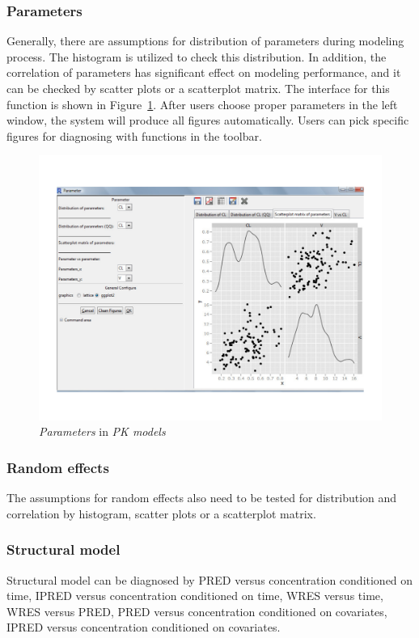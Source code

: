 \documentclass[a4paper]{article}
\begin{document}
\subsubsection{Parameters}
Generally, there are assumptions for distribution of parameters during modeling process. The histogram is utilized to check this distribution. In addition, the correlation of parameters has significant effect on modeling performance, and it can be checked by scatter plots or a scatterplot matrix.
\newline
\newline
The interface for this function is shown in Figure~\ref{pkmodel_para}. After users choose proper parameters in the left window, the system will produce all figures automatically. Users can pick specific figures for diagnosing with functions in the toolbar.\begin{figure}[h!tb] \centering
\includegraphics[scale=0.6]{pkmodel_para.pdf}
\caption{\textit{Parameters} in \textit{PK models}}
\label{pkmodel_para}
\end{figure}
\subsubsection{Random effects}
The assumptions for random effects also need to be tested for distribution and correlation by histogram, scatter plots or a scatterplot matrix.
\subsubsection{Structural model}
Structural model can be diagnosed by PRED versus concentration conditioned on time, IPRED versus concentration conditioned on time, WRES versus time, WRES versus PRED, PRED versus concentration conditioned on covariates, IPRED versus concentration conditioned on covariates.
\end{document}
